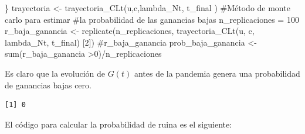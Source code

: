 \documentclass[
  us-letterpaper,
]{scrreprt}
\newenvironment{Shaded}{\begin{snugshade}}{\end{snugshade}}
\newcommand{\CommentTok}[1]{\textcolor[rgb]{0.37,0.37,0.37}{#1}}
\newcommand{\DecValTok}[1]{\textcolor[rgb]{0.68,0.00,0.00}{#1}}
\newcommand{\FunctionTok}[1]{\textcolor[rgb]{0.28,0.35,0.67}{#1}}
\newcommand{\NormalTok}[1]{\textcolor[rgb]{0.00,0.23,0.31}{#1}}
\newcommand{\OtherTok}[1]{\textcolor[rgb]{0.00,0.23,0.31}{#1}}
\newcommand{\SpecialCharTok}[1]{\textcolor[rgb]{0.37,0.37,0.37}{#1}}
\theoremstyle{plain}
\theoremstyle{plain}
\theoremstyle{definition}
\theoremstyle{remark}
\begin{document}
\begin{Shaded}
\begin{Highlighting}[]
\NormalTok{\}}
\NormalTok{trayectoria }\OtherTok{\textless{}{-}} \FunctionTok{trayectoria\_CLt}\NormalTok{(u,c,lambda\_Nt, t\_final )}
\CommentTok{\#Método de monte carlo para estimar }
\CommentTok{\#la probabilidad de las ganancias bajas}
\NormalTok{n\_replicaciones }\OtherTok{=} \DecValTok{100}
\NormalTok{r\_baja\_ganancia }\OtherTok{\textless{}{-}} \FunctionTok{replicate}\NormalTok{(n\_replicaciones,}
\FunctionTok{trayectoria\_CLt}\NormalTok{(u, c, lambda\_Nt, t\_final)}
\NormalTok{[}\DecValTok{2}\NormalTok{])}
\CommentTok{\#r\_baja\_ganancia }
\NormalTok{prob\_baja\_ganancia }\OtherTok{\textless{}{-}} \FunctionTok{sum}\NormalTok{(r\_baja\_ganancia }\SpecialCharTok{\textgreater{}}\DecValTok{0}\NormalTok{)}\SpecialCharTok{/}\NormalTok{n\_replicaciones}
\end{Highlighting}
\end{Shaded}

Es claro que la evolución de \(G(t)\) antes de la pandemia genera una
probabilidad de ganancias bajas cero.

\begin{verbatim}
[1] 0
\end{verbatim}

El código para calcular la probabilidad de ruina es el siguiente:
\end{document}
